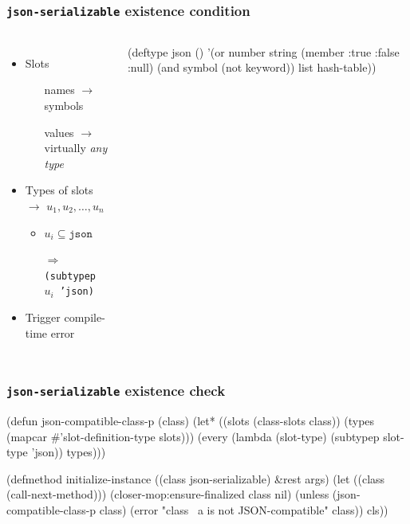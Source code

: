 \documentclass[aspectratio=169]{beamer}
\renewcommand\code[1]{\texttt{#1}}
\newcommand\rarr{\ensuremath{\rightarrow}}
\newcommand\Rarr{\ensuremath{\Rightarrow}}
\newcommand\tgood{{\color{watchOS-purple}\faThumbsOUp}}
\newcommand\tbad{{\color{watchOS-red}\faThumbsODown}}
\begin{document}
\begin{frame}[fragile]
  \frametitle{\code{json-serializable} existence condition}
  \begin{columns}
    \begin{itemize}
    \item Slots
      \begin{itemize}
      \item[\tgood] names \rarr{} symbols
      \item[\tbad] values \rarr{} virtually \emph{any type}
      \end{itemize}
    \item<3-> Types of slots \rarr{} $u_1, u_2, \dots, u_n$
      \begin{itemize}
      \item $u_i \subseteq \code{json}$
      \item[\Rarr{}] \code{(subtypep $u_i$ 'json)}
      \end{itemize}
    \item<3-> Trigger compile-time error
  \end{itemize}

\begin{clcode}
(deftype json ()
  '(or number
       string
       (member :true
               :false
               :null)
       (and symbol
            (not keyword))
       list
       hash-table))
\end{clcode}
  \end{columns}
\end{frame}

\begin{frame}[fragile]
  \frametitle{\code{json-serializable} existence check}
\begin{clcode}
(defun json-compatible-class-p (class)
  (let* ((slots (class-slots class))
         (types (mapcar #'slot-definition-type slots)))
    (every (lambda (slot-type)
             (subtypep slot-type 'json))
           types)))

(defmethod initialize-instance ((class json-serializable)
                                &rest args)
  (let ((class (call-next-method)))
    (closer-mop:ensure-finalized class nil)
    (unless (json-compatible-class-p class)
      (error "class ~a is not JSON-compatible" class))
    cls))
\end{clcode}
\end{frame}
\end{document}
